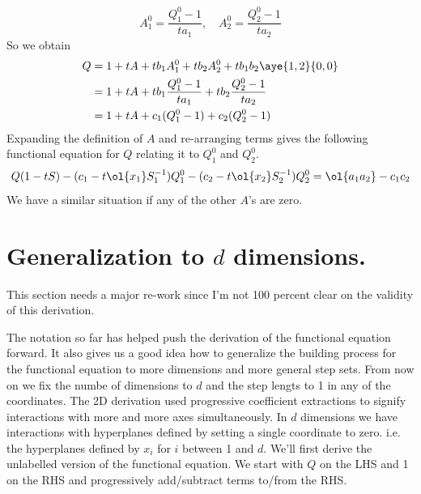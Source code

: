 \[
	A_1^0 = \frac{Q_1^0-1}{ta_1},\quad    A_2^0 = \frac{Q_2^0-1}{ta_2}
\]
So we obtain
\begin{align*}
	Q &= 1+ tA + tb_1A_1^0+tb_2 A_2^0 + tb_1b_2 \aye{1,2}{0,0}\\
	    &= 1+ t A + tb_1\frac{Q_1^0-1}{ta_1}+ tb_2\frac{Q_2^0-1}{ta_2}\\
	    &= 1+ tA + c_1(Q_1^0-1)+c_2(Q_2^0-1)
\end{align*}
Expanding the definition of $A$ and re-arranging terms gives the following functional equation for $Q$ relating it to $Q_1^0$ and $Q_2^0$.
\[
	 Q(1-tS) - (c_1-t\ol{x_1}S_1^{-1})Q_1^0 - (c_2-t\ol{x_2}S_2^{-1})Q_2^0 = \ol{a_1 a_2} - c_1c_2
\]
We have a similar situation if any of the other $A$'s are zero.
\section{Generalization to $d$ dimensions.}

This section needs a major re-work since I'm not 100 percent clear on the validity of this derivation.

The notation so far has helped push the derivation of the functional equation forward. It also gives us a good idea how to generalize the building process for the functional equation to more dimensions and more general step sets. From now on we fix the numbe of dimensions to $d$ and the step lengts to 1 in any of the coordinates. The 2D derivation used progressive coefficient extractions to signify interactions with more and more axes simultaneously. In $d$ dimensions we have interactions with hyperplanes defined by setting a single coordinate to zero. i.e. the hyperplanes defined by $x_i$ for $i$ between 1 and $d$. We'll first derive the unlabelled version of the functional equation. We start with $Q$ on the LHS and 1 on the RHS and progressively add/subtract terms to/from the RHS.

